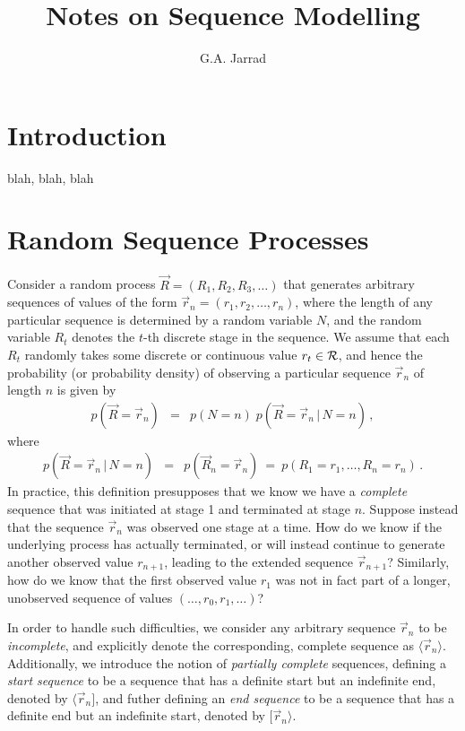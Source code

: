 \documentclass[a4paper]{article}
\title{Notes on Sequence Modelling}
\author{G.A. Jarrad}
\begin{document}
\maketitle
{}
\section{Introduction}\label{sec:intro}
blah, blah, blah

\section{Random Sequence Processes}
\label{sec:random-processes}
Consider a random process $\vec{R}=(R_1,R_2,R_3,\ldots)$ that generates arbitrary sequences of values
of the form $\vec{r}_n=(r_1,r_2,\ldots,r_n)$, where the length of any particular sequence is 
determined by a random variable $N$,
and the random variable $R_t$ denotes the $t$-th discrete stage in the sequence.
We assume that each $R_t$ randomly takes some discrete or continuous value $r_t\in{\cal R}$,
and hence the probability (or probability density) of observing a particular
sequence $\vec{r}_n$ of length $n$ is given by
\begin{eqnarray}
   p(\vec{R}=\vec{r}_n) & = & p(N=n)\; p(\vec{R}=\vec{r}_n\,|\,N=n)\,,
\end{eqnarray}
where
\begin{eqnarray}
p(\vec{R}=\vec{r}_n\,|\,N=n)
& = & p(\vec{R}_n=\vec{r}_n)~=~p(R_1=r_1,\ldots,R_n=r_n)\,.
\end{eqnarray}
In practice, this definition presupposes that we know we have a {\em complete} sequence that was initiated
at stage 1 and terminated at stage $n$.
Suppose instead that the sequence $\vec{r}_n$ was observed one stage at a time. How do we know if the
underlying process has actually terminated, or will instead
continue to generate another observed value
$r_{n+1}$, leading to the extended sequence $\vec{r}_{n+1}$? 
Similarly, how do we know that the first observed value $r_1$ was not in fact
part of a longer, unobserved sequence of values $(\ldots,r_0,r_1,\ldots)$?

In order to handle such difficulties, we consider any arbitrary sequence $\vec{r}_n$ to be {\em incomplete},
and explicitly denote the corresponding, complete sequence as $\langle\vec{r}_n\rangle$.
Additionally, we introduce the notion of {\em partially complete} sequences, 
defining a {\em start sequence} to be a sequence that has a definite start but an indefinite end,
denoted by $\langle\vec{r}_n]$, and futher defining an {\em end sequence} to be a sequence
that has a definite end but an indefinite start, denoted by $[\vec{r}_n\rangle$.
\end{document}
